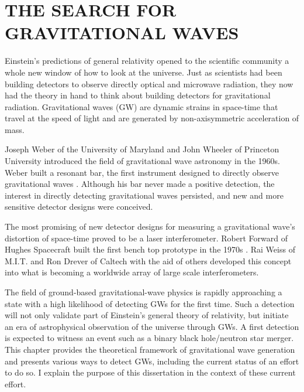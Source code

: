 \chapter{THE SEARCH FOR GRAVITATIONAL WAVES}


Einstein's predictions of general relativity opened to the scientific
community a whole new window of how to look at the universe. Just as
scientists had been building detectors to observe directly optical and
microwave radiation, they now had the theory in hand to think about
building detectors for gravitational radiation. Gravitational waves
(GW) are dynamic strains in space-time that travel at the speed of
light and are generated by non-axisymmetric acceleration of mass.

Joseph Weber of the University of Maryland and John Wheeler of
Princeton University introduced the field of gravitational wave
astronomy in the 1960s. Weber built a resonant bar, the first
instrument designed to directly observe gravitational waves
\cite{Weber1960Detection}. Although his bar never made a positive
detection, the interest in directly detecting gravitational waves
persisted, and new and more sensitive detector designs were conceived.

The most promising of new detector designs for measuring a
gravitational wave's distortion of space-time proved to be a laser
interferometer. Robert Forward of Hughes Spacecraft built the first
bench top prototype in the 1970s \cite{Forward1978Wideband}. Rai Weiss
of M.I.T. and Ron Drever of Caltech with the aid of others developed
this concept into what is becoming a worldwide array of large scale
interferometers.

The field of ground-based gravitational-wave physics is rapidly
approaching a state with a high likelihood of detecting GWs for the
first time. Such a detection will not only validate part of Einstein's
general theory of relativity, but initiate an era of astrophysical
observation of the universe through GWs.  A first detection is
expected to witness an event such as a binary black hole/neutron star
merger. This chapter provides the theoretical framework of
gravitational wave generation and presents various ways to detect GWs,
including the current status of an effort to do so. I explain the
purpose of this dissertation in the context of these current effort.


